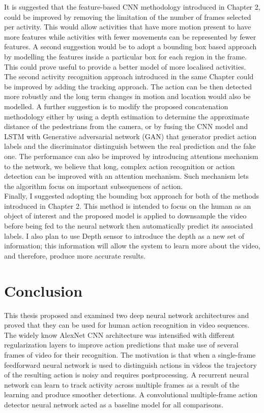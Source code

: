 It is suggested that the feature-based CNN methodology introduced in Chapter 2, could be improved by removing the limitation of the number of frames selected per activity. This would allow activities that have more motion present to have more features while activities with fewer movements can be represented by fewer features. A second suggestion would be to adopt a bounding box based approach by modelling the features
inside a particular box for each region in the frame. This could prove useful to provide a better model of more localised activities.\\

The second activity recognition approach introduced in the same Chapter could be improved by adding the tracking approach. The action can be then detected more robustly and the long term changes in motion and location would also be modelled. A further suggestion is to modify the proposed concatenation methodology either by using a depth estimation to determine the approximate distance of the pedestrians from the camera, or by fusing the CNN model and LSTM with Generative adversarial network (GAN) that generator predict action labels and the discriminator distinguish between the real prediction and the fake one. The performance can also be improved by introducing attentions mechanism to the network, we believe that long, complex action recognition or action detection can be improved with an attention mechanism. Such mechanism lets the algorithm focus on important subsequences of action.\\

Finally, I suggested adopting the bounding box approach for both of the methods introduced in Chapter 2. This method is intended to focus on the human as an object of interest and the proposed model is applied to downsample the video before being fed to the neural network then automatically predict its associated labels. I also plan to use Depth sensor to introduce the depth as a new set of information; this information will allow the system to learn more about the video, and therefore, produce more accurate results. 

\section{Conclusion}
This thesis proposed and examined two deep neural network architectures and proved that they can be used for human action recognition in video sequences. The widely know AlexNet CNN architecture was intensified with different regularization layers to improve action predictions that make use of several frames of video for their recognition. The motivation is that when a single-frame feedforward neural network is used to distinguish actions in videos the trajectory of the resulting action is noisy and requires postprocessing. A recurrent neural network can learn to track activity across multiple frames as a result of the learning and produce smoother detections. A convolutional multiple-frame action detector neural network acted as a baseline model for all comparisons.\\

